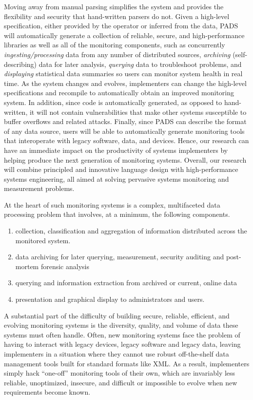 Moving away from manual parsing simplifies the system and provides the
flexibility and security that hand-written parsers do not.  Given a
high-level specification, either provided by the operator or inferred
from the data, PADS will automatically generate a collection of
reliable, secure, and high-performance libraries as well as all of the
monitoring components, such as concurrently {\em ingesting/processing}
data from any number of distributed sources, {\em archiving}
(self-describing) data for later analysis, {\em querying} data to
troubleshoot problems, and {\em displaying} statistical data summaries
so users can monitor system health in real time.  As the system
changes and evolves, implementers can change the high-level
specifications and recompile to automatically obtain an improved
monitoring system.  In addition, since code is automatically
generated, as opposed to hand-written, it will not contain
vulnerabilities that make other systems susceptible to buffer
overflows and related attacks.  Finally, since PADS can describe the
format of any data source, users will be able to automatically
generate monitoring tools that interoperate with legacy software,
data, and devices.  Hence, our research can have an
immediate impact on the productivity of systems implementers by
helping produce the next generation of monitoring systems.  Overall,
our research will combine principled and innovative language design
with high-performance systems engineering, all aimed at solving
pervasive systems monitoring and measurement problems.



At the heart of such monitoring systems is a complex, multifaceted
data processing problem that involves, at a minimum, the following components.
\begin{enumerate}
\item collection, classification and aggregation of information 
distributed across the monitored system.
\item data archiving for later querying, measurement, security auditing and 
post-mortem forensic analysis
\item querying and information extraction from archived or current, online data
\item presentation and graphical display to administrators and users.
\end{enumerate}

A substantial part of the difficulty of building secure, reliable, efficient,
and evolving monitoring systems is the diversity, quality, and volume of data
these systems must often handle.  Often, new monitoring
systems face the problem of having to interact with legacy devices,
legacy software and legacy data, leaving implementers in a situation
where they cannot use robust off-the-shelf data management tools built for
standard formats like XML.  As a result, implementers simply
hack ``one-off'' monitoring tools of their own, which are invariably
less reliable, unoptimized, insecure, and difficult or impossible to evolve
when new requirements become known.

